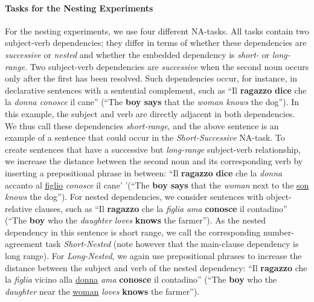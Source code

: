 \paragraph{Tasks for the Nesting Experiments} For the nesting experiments, we use four different NA-tasks. All tasks contain two subject-verb dependencies; they differ in terms of whether these dependencies are \emph{successive} or \emph{nested} and whether the embedded dependency is \emph{short-} or \emph{long-range}. Two subject-verb dependencies are \emph{successive} when the second noun occurs only after the first has been resolved. 
Such dependencies occur, for instance, in declarative sentences with a sentential complement, such as ``Il \textbf{ragazzo} \textbf{dice} che la \textit{donna conosce} il cane'' (``The \textbf{boy says} that the \emph{woman knows} the dog'').
In this example, the subject and verb are directly adjacent in both dependencies.
We thus call these dependencies \emph{short-range}, and the above sentence is an example of a sentence that could occur in the \emph{Short-Successive} NA-task. 
To create sentences that have a successive but \emph{long-range} subject-verb relationship, we increase the distance between the second noun and its corresponding verb by inserting a prepositional phrase in between: ``Il \textbf{ragazzo} \textbf{dice} che la \textit{donna} accanto al \underline{figlio} \textit{conosce} il cane' '(``The \textbf{boy says} that the \emph{woman} next to the \underline{son} \emph{knows} the dog''). For nested dependencies, we consider sentences with object-relative clauses, such as ``Il \textbf{ragazzo} che la \emph{figlia} \emph{ama} \textbf{conosce} il contadino'' (``The \textbf{boy} who the \emph{daughter} \emph{loves} \textbf{knows} the farmer'').
As the nested dependency in this sentence is short range, we call the corresponding number-agreement task \emph{Short-Nested} (note however that the main-clause dependency is long range). For \emph{Long-Nested}, we again use prepositional phrases to increase the distance between the subject and verb of the nested dependency: ``Il \textbf{ragazzo} che la \emph{figlia} vicino alla \underline{donna} \emph{ama} \textbf{conosce} il contadino'' (``The \textbf{boy} who the \emph{daughter} near the \underline{woman} \emph{loves} \textbf{knows} the farmer'').

